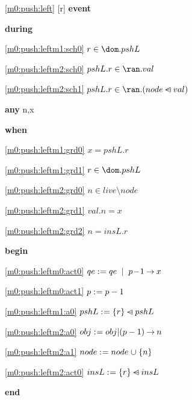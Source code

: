 \noindent \ref{m0:push:left} [r] \textbf{event}
\begin{block}
  \item   \textbf{during}
  \begin{block}
  \item[ \eqref{m0:push:leftm1:sch0} ]$r \in \dom.pshL $ %
  \item[ \eqref{m0:push:leftm2:sch0} ]$pshL.r \in \ran.val $ %
  \item[ \eqref{m0:push:leftm2:sch1} ]$pshL.r \in \ran.(node \domsub val) $ %
  \end{block}
  \item   \textbf{any} n,x
  \item   \textbf{when}
  \begin{block}
  \item[ \eqref{m0:push:leftm1:grd0} ]$x = pshL.r $ %
  \item[ \eqref{m0:push:leftm1:grd1} ]$r \in \dom.pshL $ %
  \item[ \eqref{m0:push:leftm2:grd0} ]$n \in live \setminus node $ %
  \item[ \eqref{m0:push:leftm2:grd1} ]$val.n = x $ %
  \item[ \eqref{m0:push:leftm2:grd2} ]$n = insL.r $ %
  \end{block}
  \item   \textbf{begin}
  \begin{block}
  \item[ \eqref{m0:push:leftm0:act0} ]$qe \mathrel{:\mkern1mu=} qe \; \; | \; \; p\! - \!1 \mathbin\rightarrow x $ %
  \item[ \eqref{m0:push:leftm0:act1} ]$p \mathrel{:\mkern1mu=} p-1$ %
  \item[ \eqref{m0:push:leftm1:a0} ]$pshL \mathrel{:\mkern1mu=} \{ r \} \mathbin{\lhd\mkern-14mu-} pshL $ %
  \item[ \eqref{m0:push:leftm2:a0} ]$obj \mathrel{:\mkern1mu=} obj | (p-1) \mathbin\rightarrow n $ %
  \item[ \eqref{m0:push:leftm2:a1} ]$node \mathrel{:\mkern1mu=} node \mathbin{\mkern1mu\cup\mkern1mu} \{ n \} $ %
  \item[ \eqref{m0:push:leftm2:act0} ]$insL \mathrel{:\mkern1mu=} \{ r \} \mathbin{\lhd\mkern-14mu-} insL $ %
  \end{block}
  \item   \textbf{end} \\
\end{block}
